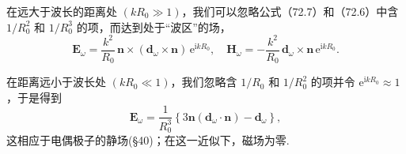 在远大于波长的距离处 $(kR_0\gg 1)$，我们可以忽略公式（72.7）和（72.6）中含 $1/R_0^2$ 和 $1/R_0^3$ 的项，而达到处于“波区”的场，
\begin{equation*}
  \boldsymbol{E}_\omega=\frac{k^2}{R_0}\,\boldsymbol{n}\times(\boldsymbol{d}_\omega\times\boldsymbol{n})\,\mathrm{e}^{\mathrm{i}kR_0},\quad
  \boldsymbol{H}_\omega=-\frac{k^2}{R_0}\,\boldsymbol{d}_\omega\times\boldsymbol{n}\,\mathrm{e}^{\mathrm{i}kR_0}.
\end{equation*}

在距离远小于波长处 $(kR_0\ll 1)$，我们忽略含 $1/R_0$ 和 $1/R_0^2$ 的项并令 $\mathrm{e}^{\mathrm{i}kR_0}\approx 1$，于是得到
\begin{equation*}
  \boldsymbol{E}_\omega=\frac{1}{R_0^3}\left\{3\boldsymbol{n}(\boldsymbol{d}_\omega\cdot\boldsymbol{n})-\boldsymbol{d}_\omega\right\},
\end{equation*}
这相应于电偶极子的静场(§40)；在这一近似下，磁场为零.

